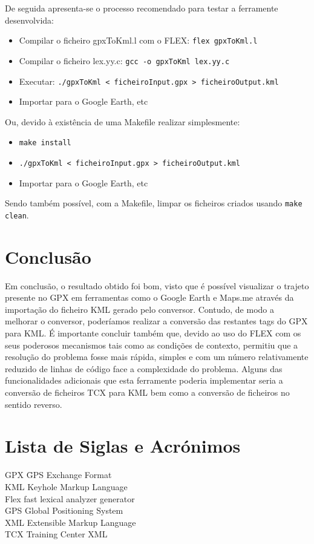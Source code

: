 \documentclass{llncs}
\begin{document}
De seguida apresenta-se o processo recomendado para testar a ferramente desenvolvida:
\begin{itemize}
    \item Compilar o ficheiro gpxToKml.l com o FLEX: \verb|flex gpxToKml.l|
    \item Compilar o ficheiro lex.yy.c: \verb|gcc -o gpxToKml lex.yy.c|
    \item Executar: \verb|./gpxToKml < ficheiroInput.gpx > ficheiroOutput.kml|
    \item Importar para o Google Earth, etc
\end{itemize}

Ou, devido à existência de uma Makefile realizar simplesmente:
\begin{itemize}
    \item \verb|make install|
    \item \verb|./gpxToKml < ficheiroInput.gpx > ficheiroOutput.kml|
    \item Importar para o Google Earth, etc
\end{itemize}

Sendo também possível, com a Makefile, limpar os ficheiros criados usando \verb|make clean|.

\section{Conclusão}
Em conclusão, o resultado obtido foi bom, visto que é possível visualizar o trajeto presente no GPX em ferramentas como o Google Earth e Maps.me através da importação do ficheiro KML gerado pelo conversor. Contudo, de modo a melhorar o conversor, poderíamos realizar a conversão das restantes tags do GPX para KML. É importante concluir também que, devido ao uso do FLEX com os seus poderosos mecanismos tais como as condições de contexto, permitiu que a resolução do problema fosse mais rápida, simples e com um número relativamente reduzido de linhas de código face a complexidade do problema. Alguns das funcionalidades adicionais que esta ferramente poderia implementar seria a conversão de ficheiros TCX para KML bem como a conversão de ficheiros no sentido reverso. 

\section{Lista de Siglas e Acrónimos}
\begin{tabbing}
GPX \= GPS Exchange Format \\
KML \> Keyhole Markup Language \\
Flex \> fast lexical analyzer generator \\
GPS \> Global Positioning System \\
XML \> Extensible Markup Language \\
TCX \> Training Center XML
\end{tabbing}
\end{document}
